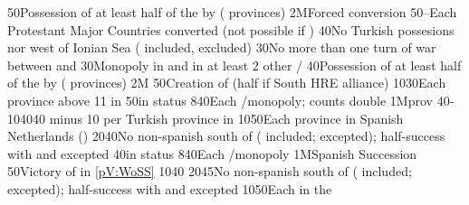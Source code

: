 %
%
%
{}{50}{Possession of at least half of the \payshongrie by \AUSaus (
  provinces)}%
%
\EUobjective2M{Forced conversion}{\MAJ}%
{50}{--}{Each Protestant Major Countries converted (not possible if \CATHCO)}%
%
%
{}{40}{No Turkish possesions nor \VASSAL west of Ionian Sea
  ( included, \paystripoli excluded)}%
%
%
{}{30}{No more than one turn of war between  and
  }%
%
%
{}{30}{Monopoly in  and in at least 2 other \CTZ/\STZ}%
%
%
%
{}{40}{Possession of at least half of the \payshongrie by \AUSaus (
  provinces)}%
%
\EUobjective2M{}{}%
{}{50}{Creation of  (half if South HRE alliance)}%
%
%
{10}{30}{Each province above 11 in \AUSaus}%
%
%
{}{50}{\paysportugal in \ANNEXION status}%
%
%
{8}{40}{Each \CTZ/\STZ monopoly;  counts double}%
%
%
\EUobjective1M{\payshongrie}{\TUR prov}%
{40-10}{40}{40 \VPs minus 10 \VPs per Turkish province in \payshongrie}%
%
%
{10}{50}{Each province in Spanish Netherlands (\regionBelgique)}%
%
%
{20}{40}{No non-spanish \COL south of 
  ( included;  excepted); half-success
  with  and  excepted}%
%
%
{}{40}{\paysportugal in \ANNEXION status}%
%
%
{8}{40}{Each \CTZ/\STZ monopoly}%
%
%
\EUobjective1M{Spanish Succession}{}%
{}{50}{Victory of \SPA in \ref{pV:WoSS}}%
%
%
{10}{40}{}%
%
%
{20}{45}{No non-spanish \COL south of 
  ( included;  excepted); half-success
  with  and  excepted}%
%
%
{10}{50}{Each \Presidio in the }%
%
%
